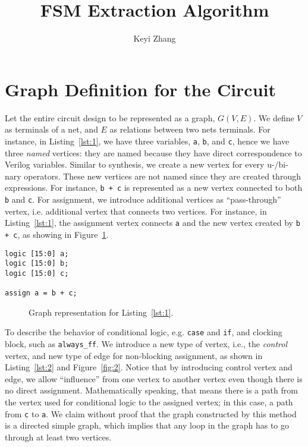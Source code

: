 \documentclass{article}
\title{FSM Extraction Algorithm}
\author{Keyi Zhang}
\begin{document}
\maketitle
\section{Graph Definition for the Circuit}\label{sec:1}
Let the entire circuit design to be represented as a graph, $G(V, E)$. We define $V$
as terminals of a net, and $E$ as relations between two nets terminals.
For instance, in Listing~\ref{lst:1}, we have three variables, \texttt{a}, \texttt{b},
and \texttt{c}, hence we have three \textit{named} vertices: they are named because
they have direct correspondence to Verilog variables. Similar to synthesis, we create
a new vertex for every u-/bi-nary operators. These new vertices are not named
since they are created through expressions. For instance, \texttt{b + c} is represented
as a new vertex connected to both \texttt{b} and \texttt{c}.
For assignment, we introduce additional vertices as
``pass-through'' vertex, i.e. additional vertex that connects two vertices. For instance,
in Listing~\ref{lst:1}, the assignment vertex connects \texttt{a} and the new vertex
created by \texttt{b + c}, as showing in Figure~\ref{fig:1}.
\begin{lstlisting}[style={verilog-style}, caption={Graph example from Verilog},
    label={lst:1}]
logic [15:0] a;
logic [15:0] b;
logic [15:0] c;

assign a = b + c;
\end{lstlisting}

\begin{figure}
    \centering
    \begin{tikzpicture}
    
    \end{tikzpicture}
    \caption{Graph representation for Listing~\ref{lst:1}.}
    \label{fig:1}
\end{figure}

To describe the behavior of conditional logic, e.g. \texttt{case} and \texttt{if}, and
clocking block, such as \texttt{always\_ff}. We introduce a new type of vertex, i.e.,
the \textit{control} vertex, and new type of edge for non-blocking assignment, as
shown in Listing~\ref{lst:2} and Figure~\ref{fig:2}. Notice that by introducing
control vertex and edge, we allow ``influence'' from one vertex to another vertex
even though there is no direct assignment. Mathematically speaking, that means
there is a path from the vertex used for conditional logic to the assigned vertex; in
this case, a path from \texttt{c} to \texttt{a}. We claim without proof that the graph
constructed by this method is a directed simple graph, which implies that any loop
in the graph has to go through at least two vertices.
\end{document}
